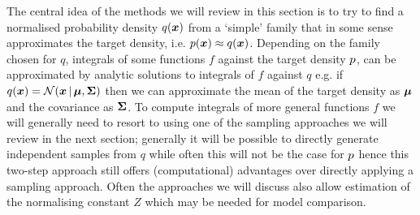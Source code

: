 
The central idea of the methods we will review in this section is to try to find a normalised probability density $q(\boldsymbol{x})$ from a `simple' family that in some sense approximates the target density, i.e. $p(\boldsymbol{x}) \approx q(\boldsymbol{x})$. Depending on the family chosen for $q$, integrals of some functions $f$ against the target density $p$, can be approximated by analytic solutions to integrals of $f$ against $q$ e.g. if $q(\vct{x}) = \nrm{\vct{x} \gvn \vct{\mu},\mtx{\Sigma}}$ then we can approximate the mean of the target density as $\boldsymbol{\mu}$ and the covariance as $\boldsymbol{\Sigma}$. To compute integrals of more general functions $f$ we will generally need to resort to using one of the sampling approaches we will review in the next section; generally it will be possible to directly generate independent samples from $q$ while often this will not be the case for $p$ hence this two-step approach still offers (computational) advantages over directly applying a sampling approach. Often the approaches we will discuss also allow estimation of the normalising constant $Z$ which may be needed for model comparison.

